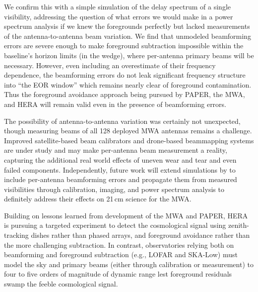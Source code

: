 We confirm this with a simple simulation of the delay spectrum of a single visibility, addressing the question of what errors we would make in a power spectrum analysis if we knew the foregrounds perfectly but lacked measurements of the antenna-to-antenna beam variation. We find that unmodeled beamforming errors are severe enough to make foreground subtraction impossible within the baseline's horizon limits (in the wedge), where per-antenna primary beams will be necessary. However, even including an overestimate of their frequency dependence, the beamforming errors do not leak significant frequency structure into ``the EOR window'' which remains nearly clear of foreground contamination. Thus the foreground avoidance approach being pursued by PAPER, the MWA, and HERA will remain valid even in the presence of beamforming errors.

The possibility of antenna-to-antenna variation was certainly not unexpected, though measuring beams of all 128 deployed MWA antennas remains a challenge. Improved satellite-based beam calibrators and drone-based beammapping systems are under study and may make per-antenna beam measurement a reality, capturing the additional real world effects of uneven wear and tear and even failed components. Independently, future work will extend simulations by \citet{nithya15} to include per-antenna beamforming errors and propagate them from measured visibilities through calibration, imaging, and power spectrum analysis to definitely address their effects on 21\,cm science for the MWA. 

Building on lessons learned from development of the MWA and PAPER, HERA is pursuing a targeted experiment to detect the cosmological signal using zenith-tracking dishes rather than phased arrays, and foreground avoidance rather than the more challenging subtraction. In contrast, observatories relying both on beamforming and foreground subtraction (e.g., LOFAR and SKA-Low) must model the sky and primary beams (either through calibration or measurement) to four to five orders of magnitude of dynamic range lest foreground residuals swamp the feeble cosmological signal.


